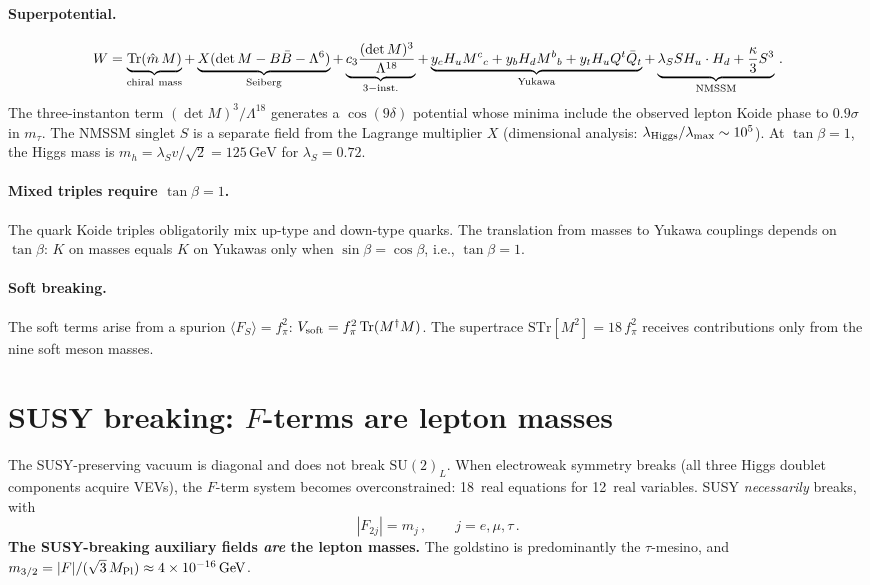 \documentclass[12pt,a4paper]{article}
\newcommand{\SU}{\mathrm{SU}}
\newcommand{\Tr}{\mathrm{Tr}}
\newcommand{\GeV}{\,\mathrm{GeV}}
\begin{document}
\paragraph{Superpotential.}
\begin{equation}
  W = \underbrace{\Tr(\hat{m}\,M)}_{\rm chiral~mass}
    + \underbrace{X(\det M - B\bar{B} - \Lambda^6)}_{\rm Seiberg}
    + \underbrace{c_3\frac{(\det M)^3}{\Lambda^{18}}}_{\rm 3-inst.}
    + \underbrace{y_c H_u M^c{}_c + y_b H_d M^b{}_b
      + y_t H_u Q^t\bar{Q}_t}_{\rm Yukawa}
    + \underbrace{\lambda_S S H_u \cdot H_d
      + \frac{\kappa}{3}S^3}_{\rm NMSSM}\,.
  \label{eq:W}
\end{equation}
The three-instanton term $(\det M)^3/\Lambda^{18}$ generates a
$\cos(9\delta)$ potential whose minima include the observed lepton
Koide phase to $0.9\sigma$ in $m_\tau$.
The NMSSM singlet $S$ is a separate field from the Lagrange
multiplier $X$ (dimensional analysis:
$\lambda_{\rm Higgs}/\lambda_{\rm max} \sim 10^5$).
At $\tan\beta = 1$, the Higgs mass is
$m_h = \lambda_S v/\sqrt{2} = 125\GeV$ for $\lambda_S = 0.72$.

\paragraph{Mixed triples require $\tan\beta = 1$.}
The quark Koide triples obligatorily mix up-type and down-type
quarks.
The translation from masses to Yukawa couplings depends on
$\tan\beta$: $K$ on masses equals $K$ on Yukawas only when
$\sin\beta = \cos\beta$, i.e., $\tan\beta = 1$.

\paragraph{Soft breaking.}
The soft terms arise from a spurion $\langle F_S \rangle = f_\pi^2$:
$V_{\rm soft} = f_\pi^2\,\Tr(M^\dagger M)$.
The supertrace $\mathrm{STr}[M^2] = 18\,f_\pi^2$ receives
contributions only from the nine soft meson masses.


\section{SUSY breaking: $F$-terms are lepton masses}
\label{sec:susy_breaking}

The SUSY-preserving vacuum is diagonal and does not break
$\SU(2)_L$.
When electroweak symmetry breaks (all three Higgs doublet
components acquire VEVs), the $F$-term system becomes
overconstrained: 18~real equations for 12~real variables.
SUSY \emph{necessarily} breaks, with
\begin{equation}
  |F_{2j}| = m_j\,, \qquad j = e, \mu, \tau\,.
  \label{eq:F_lepton}
\end{equation}
\textbf{The SUSY-breaking auxiliary fields \emph{are} the
lepton masses.}
The goldstino is predominantly the $\tau$-mesino, and
$m_{3/2} = |F|/(\sqrt{3}\,M_{\rm Pl})
\approx 4 \times 10^{-16}\GeV$.
\end{document}
